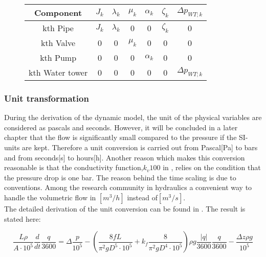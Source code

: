 \begin{figure}[H]
	\centering
\begin{tabular}{c|cccccc} 
  			\bfseries Component    &     $J_k$    &     $\lambda_k$    &    $\mu_k$    &   $\alpha_k$    &  $\zeta_k$   &	$\Delta p_{WT;k}$	\\ \hline
			kth Pipe		  	   &     $J_k$    &     $\lambda_k$    &    0          &   0             &  $\zeta_k$   &   0	    			\\ 
			kth Valve              &     0        &     0              &    $\mu_k$    &   0 		     &  0    		&   0					\\ 
			kth Pump 		       &     0        &     0              &    0          &   $\alpha_k$    &  0    		&   0	    			\\
			kth Water tower 	   &     0        &     0              &    0          &   0             &  0    		&   $\Delta p_{WT;k}$	    
\end{tabular}
		\label{tab:parametrization_model}

\end{figure}	

\subsubsection{Unit transformation}
\label{unittransform}

During the derivation of the dynamic model, the unit of the physical variables are considered as pascals and seconds. However, it will be concluded in a later chapter that the flow is significantly small compared to the pressure if the SI-units are kept. Therefore a unit conversion is carried out from Pascal[Pa] to bars and from seconds[s] to hours[h]. Another reason which makes this conversion reasonable is that the conductivity function,$k_v100$ in , relies on the condition that the pressure drop is one bar. The reason behind the time scaling is due to conventions. Among the research community in hydraulics a convenient way to handle the volumetric flow in $[m^3/h]$ instead of$[m^3/s]$. 
\\
The detailed derivation of the unit conversion can be found in . The result is stated here: 

\begin{equation}
   \frac{L \rho}{A\cdot10^5} \frac{d}{dt}\frac{q}{3600} = \Delta \frac{p}{10^5} - (\frac{8fL}{\pi^{2}gD^5\cdot10^5} + k_f \frac{8}{\pi^2gD^4\cdot10^5}) \rho g \frac{|q|}{3600} \frac{q}{3600} - \frac{\Delta z \rho g}{10^5}
\end{equation}
